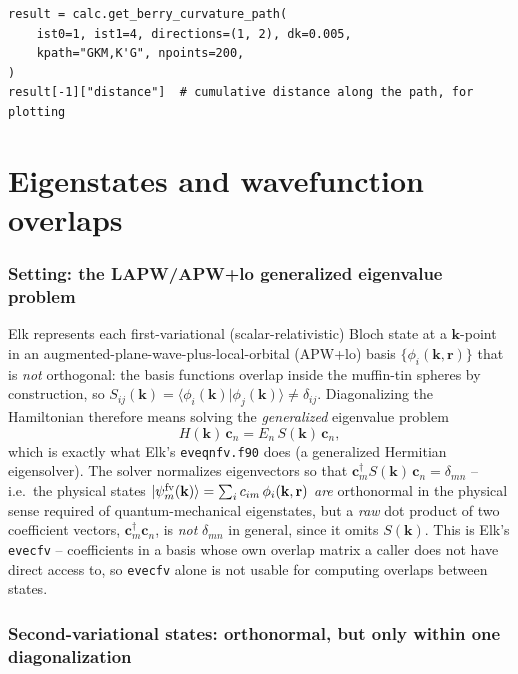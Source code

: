 \documentclass[11pt]{article}
\begin{document}
\begin{verbatim}
result = calc.get_berry_curvature_path(
    ist0=1, ist1=4, directions=(1, 2), dk=0.005,
    kpath="GKM,K'G", npoints=200,
)
result[-1]["distance"]  # cumulative distance along the path, for plotting
\end{verbatim}

\part{Eigenstates and wavefunction overlaps}
\label{part:eigenstates}

\section{Setting: the LAPW/APW+lo generalized eigenvalue problem}

Elk represents each first-variational (scalar-relativistic) Bloch state at a
$\mathbf k$-point in an augmented-plane-wave-plus-local-orbital (APW+lo) basis
$\{\phi_i(\mathbf k,\mathbf r)\}$ that is \emph{not} orthogonal: the basis functions overlap
inside the muffin-tin spheres by construction, so $S_{ij}(\mathbf k) = \langle
\phi_i(\mathbf k)|\phi_j(\mathbf k)\rangle \neq \delta_{ij}$. Diagonalizing the Hamiltonian
therefore means solving the \emph{generalized} eigenvalue problem
\begin{equation}
  H(\mathbf k)\,\mathbf c_n = E_n\, S(\mathbf k)\,\mathbf c_n,
  \label{eq:genevp}
\end{equation}
which is exactly what Elk's \texttt{eveqnfv.f90} does (a generalized Hermitian eigensolver).
The solver normalizes eigenvectors so that $\mathbf c_m^\dagger S(\mathbf k)\, \mathbf c_n =
\delta_{mn}$ -- i.e.\ the physical states $|\psi_m^{\rm fv}(\mathbf k)\rangle = \sum_i
c_{im}\,\phi_i(\mathbf k,\mathbf r)$ \emph{are} orthonormal in the physical sense required of
quantum-mechanical eigenstates, but a \emph{raw} dot product of two coefficient vectors,
$\mathbf c_m^\dagger \mathbf c_n$, is \emph{not} $\delta_{mn}$ in general, since it omits
$S(\mathbf k)$. This is Elk's \texttt{evecfv} -- coefficients in a basis whose own overlap
matrix a caller does not have direct access to, so \texttt{evecfv} alone is not usable for
computing overlaps between states.

\section{Second-variational states: orthonormal, but only within one diagonalization}
\end{document}
